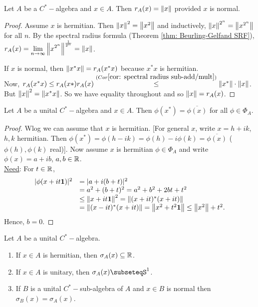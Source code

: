 \documentclass{article}
\begin{document}
\begin{boxlemma}\label{lemma: normal spectral radius}
    Let $A$ be a $C^*-$algebra and $x\in A$. Then $r_A(x)=\left\lVert x\right\rVert$ provided $x$ is normal.
\end{boxlemma}

\begin{proof}
    Assume $x$ is hermitian. Then $\left\lVert x\right\rVert^2=\left\lVert x^2\right\rVert$ and inductively, $\left\lVert x\right\rVert^{2^n}=\left\lVert x^{2^n}\right\rVert$ for all $n$. By the spectral radius formula (Theorem \ref{thm: Beurling-Gelfand SRF}), $r_A(x) = \displaystyle\lim_{n\to \infty}\left\lVert x^{2^n}\right\rVert^{\frac{1}{2^n}}=\left\lVert x\right\rVert$.

    If $x$ is normal, then $\left\lVert x^*x\right\rVert= r_A(x^*x)$ because $x^*x$ is hermitian.\\
    Now, $r_A(x^*x)\leq r_A(x*)r_A(x)\stackrel{(Cor \ref{cor: spectral radius sub-add/mult}) }{\leq} \left\lVert x^*\right\rVert\cdot\left\lVert x\right\rVert$. But $\left\lVert x\right\rVert^2 = \left\lVert x^*x\right\rVert$. So we have equality throughout and so $\left\lVert x\right\rVert = r_A(x)$.
\end{proof}

\begin{boxlemma}\label{lemma: character unital C^*-alg}
    Let $A$ be a unital $C^*-$algebra and $x\in A$. Then $\phi(x^*) = \overline{\phi(x)}$ for all $\phi\in \Phi_A$.
\end{boxlemma}

\begin{proof}
    Wlog we can assume that $x$ is hermitian. [For general $x$, write $x = h+ik$, $h,k$ hermitian. Then $\phi(x^*) = \phi(h-ik)=\phi(h)-i\phi(k)=\overline{\phi(x)}$ ($\phi(h), \phi(k)$ real)]. Now assume $x$ is hermitian $\phi\in \Phi_A$ and write $\phi(x) = a+ib$, $a,b\in \mathbb{R}$.\\

    \noindent\underline{Need}: For $t\in \mathbb{R}$, 
    $$
    \begin{array}{ll}
        |\phi(x+it\mathbf{1})|^2 &= |a+i(b+t)|^2\\
        &= a^2 + (b+t)^2= a^2+b^2+2bt+t^2\\
        &\leq \left\lVert x+it\mathbf{1}\right\rVert^2=\left\lVert(x+it)^*(x+it)\right\rVert\\
        & = \left\lVert(x-it)^*(x+it)\right\rVert = \left\lVert x^2 + t^2\mathbf{1}\right\rVert\leq \left\lVert x^2\right\rVert+t^2.
    \end{array}
    $$
    Hence, $b=0$.
\end{proof}

\begin{boxcor}\label{cor: spectrum hermitian, unitary}
    Let $A$ be a unital $C^*-$algebra.
    \begin{enumerate}[label = (\roman*), align = left]
        \item If $x\in A$ is hermitian, then $\sigma_A(x)\subseteq\mathbb{R}$.
        \item If $x\in A$ is unitary, then $\sigma_A(x)\subseteqS^1$.
        \item If $B$ is a unital $C^*-$sub-algebra of $A$ and $x\in B$ is normal then $\sigma_B(x) = \sigma_A(x)$.
    \end{enumerate}
\end{boxcor}
\end{document}

